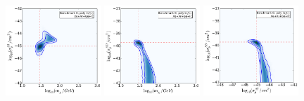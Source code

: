 \begin{figure}[p!]
  \includegraphics[trim=0.2cm 0.2cm 0.2cm 0.2cm, clip,width=0.32\textwidth]{NT/BenchmarkC_poly-mx_sigsi.pdf}
  \includegraphics[trim=0.2cm 0.2cm 0.2cm 0.2cm, clip,width=0.32\textwidth]{NT/BenchmarkC_poly-mx_sigsd.pdf}
  \includegraphics[trim=0.2cm 0.2cm 0.2cm 0.2cm, clip,width=0.32\textwidth]{NT/BenchmarkC_poly-sigsi_sigsd.pdf}


\end{figure}
